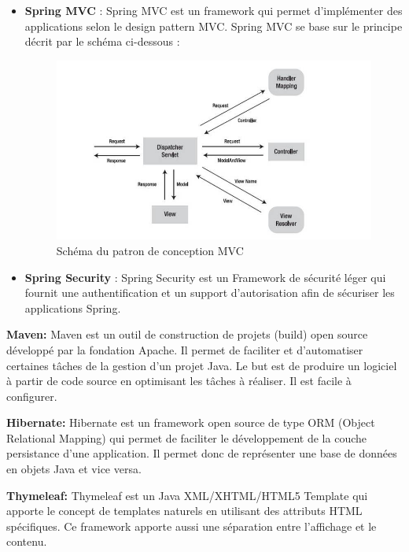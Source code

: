 \documentclass[12pt]{article}
\begin{document}
\begin{itemize}
	\item \textbf{Spring MVC} : Spring MVC est un framework qui permet d’implémenter des applications selon le design pattern MVC. Spring MVC se base sur le principe décrit par le schéma ci-dessous :\newline
	

\begin{figure}[H]
	\centering
 		\includegraphics[width=1\textwidth]{diagrammes/mvc2.jpg} 
  		\caption{Schéma du patron de conception MVC}
	\end{figure}
	
	\item \textbf{Spring Security }: Spring Security est un Framework de sécurité léger qui fournit une authentification et un support d’autorisation afin de sécuriser les applications Spring. \newline
\end{itemize} 

\textbf{Maven:} Maven est un outil de construction de projets (build) open source développé par la fondation Apache. Il permet de faciliter et d'automatiser certaines tâches de la gestion d'un projet Java. Le but est de produire un logiciel à partir de code source en optimisant les tâches à réaliser. Il est facile à configurer.\newline

\textbf{Hibernate: } Hibernate est un framework open source de type ORM (Object Relational Mapping) qui permet de faciliter le développement de la couche persistance d'une application. Il permet donc de représenter une base de données en objets Java et vice versa.

\textbf{Thymeleaf:} Thymeleaf est un Java XML/XHTML/HTML5 Template qui apporte le concept de templates naturels en utilisant des attributs HTML spécifiques. Ce framework apporte aussi une séparation entre l'affichage et le contenu.\\
\end{document}
